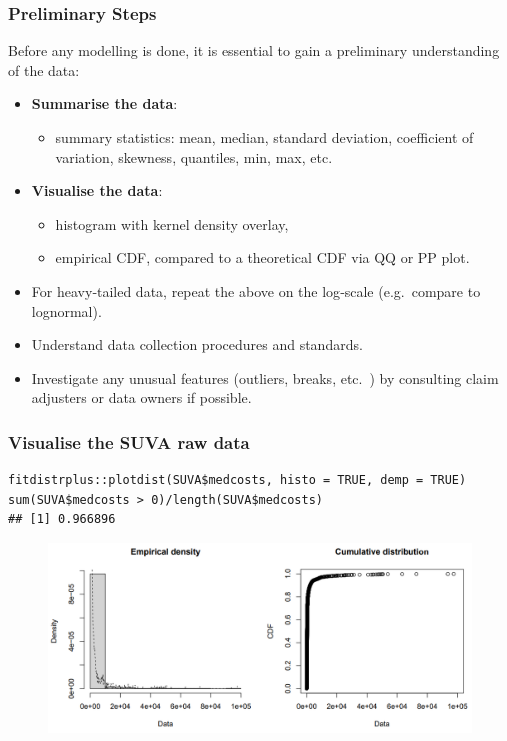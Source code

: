 \documentclass[11pt]{article}
\newcommand{\noi}{\noindent}
\begin{document}
\subsubsection{Preliminary Steps}
\noi Before any modelling is done, it is essential to gain a preliminary understanding of the data:
\begin{itemize}
  \item \textbf{Summarise the data}:
    \begin{itemize}
      \item summary statistics: mean, median, standard deviation, coefficient of variation, skewness, quantiles, min, max, etc.
    \end{itemize}
  \item \textbf{Visualise the data}:
    \begin{itemize}
      \item histogram with kernel density overlay,
      \item empirical CDF, compared to a theoretical CDF via QQ or PP plot.
    \end{itemize}
  \item For heavy‐tailed data, repeat the above on the log‐scale (e.g.\ compare to lognormal).
  \item Understand data collection procedures and standards.
  \item Investigate any unusual features (outliers, breaks, etc.\ ) by consulting claim adjusters or data owners if possible.
\end{itemize}

\subsubsection{Visualise the SUVA raw data}
\begin{lstlisting}
fitdistrplus::plotdist(SUVA$medcosts, histo = TRUE, demp = TRUE)
sum(SUVA$medcosts > 0)/length(SUVA$medcosts)
## [1] 0.966896
\end{lstlisting}
\begin{figure}[H]
    \centering
    \includegraphics[width=0.7\linewidth]{SUVA - medcosts - plot.png}
\end{figure}
\end{document}
